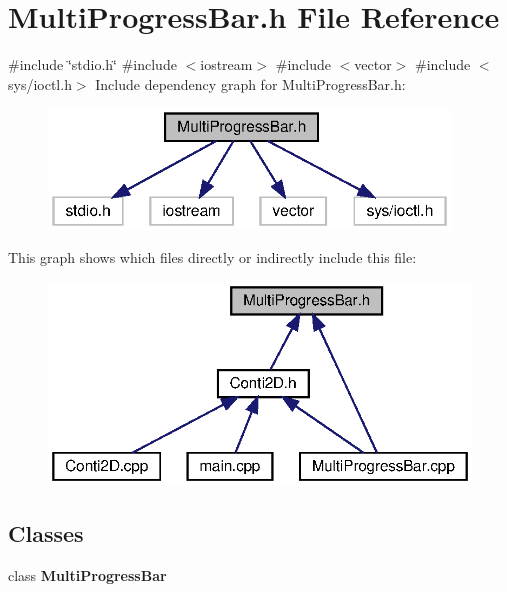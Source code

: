 \section{Multi\+Progress\+Bar.\+h File Reference}
\label{MultiProgressBar_8h}
{\ttfamily \#include \char`\"{}stdio.\+h\char`\"{}}\newline
{\ttfamily \#include $<$iostream$>$}\newline
{\ttfamily \#include $<$vector$>$}\newline
{\ttfamily \#include $<$sys/ioctl.\+h$>$}\newline
Include dependency graph for Multi\+Progress\+Bar.\+h\+:\nopagebreak
\begin{figure}[H]
\begin{center}
\leavevmode
\includegraphics[width=302pt]{MultiProgressBar_8h__incl}
\end{center}
\end{figure}
This graph shows which files directly or indirectly include this file\+:\nopagebreak
\begin{figure}[H]
\begin{center}
\leavevmode
\includegraphics[width=319pt]{MultiProgressBar_8h__dep__incl}
\end{center}
\end{figure}
\subsection*{Classes}
\begin{DoxyCompactItemize}
\item 
class \textbf{ Multi\+Progress\+Bar}
\end{DoxyCompactItemize}
